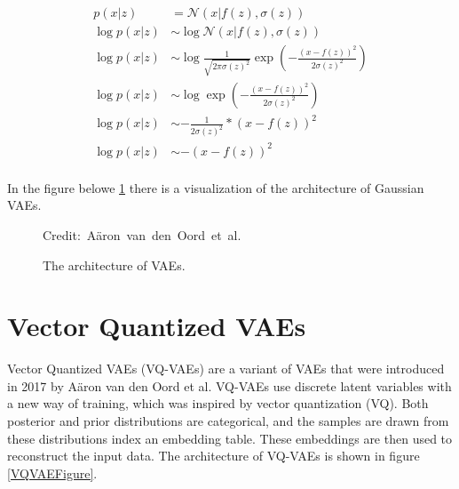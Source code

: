 \begin{equation} \label{eqMSE}
    \begin{split}
        p(x|z) &= \mathcal{N}(x|f(z), \sigma(z)) \\
        \log p(x|z) &\sim  \log \mathcal{N}(x|f(z), \sigma(z)) \\
        \log p(x|z) &\sim  \log \frac{1}{\sqrt{2 \pi \sigma(z)^2}} \exp(-\frac{(x - f(z))^2}{2 \sigma(z)^2}) \\
        \log p(x|z) &\sim  \log \exp(-\frac{(x - f(z))^2}{2 \sigma(z)^2}) \\
        \log p(x|z) &\sim  - \frac{1}{2 \sigma(z)^2} * (x - f(z))^2 \\
        \log p(x|z) &\sim  -  (x - f(z))^2 \\
    \end{split}
\end{equation}

In the figure belowe \ref{VAEFigure} there is a visualization of the architecture of Gaussian VAEs.


\begin{figure}[H]
    \centering

    \caption{ The architecture of VAEs.}
  	\medskip 
	\hspace*{15pt}\hbox{\scriptsize Credit: Aäron van den Oord et al.}
    \label{VAEFigure}
\end{figure}

\pagebreak

\section{Vector Quantized VAEs}

Vector Quantized VAEs (VQ-VAEs) are a variant of VAEs that were introduced in 2017 by Aäron van den Oord et al\cite{vqvae}. VQ-VAEs use discrete latent variables with a new way of training, which was inspired by vector quantization (VQ). Both posterior and prior distributions are categorical, and the samples are drawn from these distributions index an embedding table\cite{vqvae}. These embeddings are then used to reconstruct the input data. The architecture of VQ-VAEs is shown in figure \ref{VQVAEFigure}.

